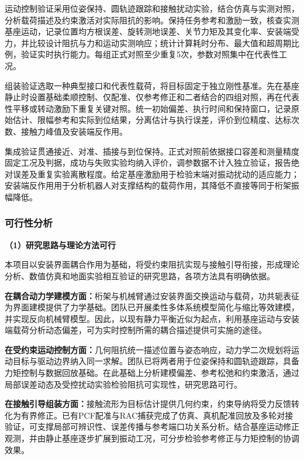 \documentclass[UTF8,a4paper,zihao=-4,fontset=fandol]{ctexart}
\newcommand{\topic}[1]{\par\Needspace{4\baselineskip}\addvspace{0.5em}\noindent\textbf{#1}\par\nobreak}
\newcommand{\rev}[1]{{\color{red}#1}}
\begin{document}
\rev{运动控制验证采用}位姿保持\rev{、}圆轨迹跟踪\rev{和接触扰动实验}，\rev{结合}仿真与实测\rev{对照}，\rev{分析载荷描述}及约束激活\rev{对实际阻抗}的\rev{影响}。\rev{保持任务参考和激励一致，核查实测基座运动，}记录位置均方根误差、旋转测地误差、关节力矩\rev{及其}变化率\rev{、}安装端\rev{受力，并比较设计阻抗与}力和\rev{运动实测响应}；\rev{统计}计算耗时分布、最大值\rev{和超}周期比例，验证实时执行能力。\rev{每组正式对照}至少\rev{重复}5次\rev{，}参数对照\rev{集中}在代表性工况。

\rev{组装验证选取}一种典型接口和代表性载荷，将目标固定于独立刚性基准。先在基座静止时\rev{设置}基础柔顺控制、仅配准、仅参考修正\rev{和}二者结合的四组对照，再\rev{在代表性}平移或转动激励\rev{下}重复关键对照。统一初始偏差、执行\rev{时间}和保持窗口，记录\rev{原始}估计\rev{、限幅参考和实际到位结果，分离估计与执行}误差\rev{，评价}到位\rev{精度}、达标次数、接触力峰值及安装端\rev{反作用}。

\rev{集成验证贯通接近、对准、插接}与\rev{到位保持。正式对照前依据}接口容差\rev{和}测量精度\rev{固定工况及判据}，成功与失败\rev{实验}均纳入评价，调参数据不计入独立验证，报告绝对误差\rev{及}重复\rev{实验}离散程度\rev{。给定基座激励用于检验末端对振动扰动的适应能力}；安装端\rev{反作用}用于分析\rev{机器人}对\rev{支撑结构}的\rev{载荷}作用，其\rev{降低}不直接等同于\rev{桁架振幅降低}。

\subsubsection{可行性分析}

\topic{（1）\rev{研究思路与理论}方法\rev{可行}}

\rev{本项目以安装界面耦合作用为基础，将受约束阻抗实现与接触引导衔接，形成理论分析、数值仿真和地面实验相互验证的研究思路，各项方法具有明确依据。}

\textbf{\rev{在耦合动力学建模方面：}}\rev{桁架与机械臂通过安装界面交换运动与载荷，功共轭表征为界面建模提供了力学基础。团队已开展柔性多体系统模型简化与缩比等效建模，并实现反向机械臂模型。因此，以}现有\rev{静力平衡近似为起点，利用基座运动与安装端载荷分析动态偏差，可为实时控制所需的耦合描述提供可实施的途径。}

\textbf{\rev{在受约束运动控制方面：}}\rev{几何阻抗统一描述位置与姿态响应，动力学二次规划将运动目标与驱动边界纳入同一求解。团队已将两者用于}位姿保持\rev{和}圆轨迹跟踪，\rev{具备力矩控制}与\rev{数据回放基础}。在此基础上\rev{分析}建模偏差\rev{、参考松弛和约束激活，通过局部误差动态}及\rev{受控扰动实验检验阻抗可实现性}，\rev{研究思路可行}。

\textbf{\rev{在}接触\rev{引导组装方面：}}\rev{接触流形为目标估计提供几何约束，约束导纳将受力反馈转化为有界修正。}已有PCF配准与RAC捕获完成了仿真、真机配准回放及多轮对接验证，可\rev{支撑局部可辨识性、误差传播}与参考\rev{端口功关系分析。结合基座运动}修正\rev{观测}，并由\rev{静止}基座逐步扩展\rev{到振动工况，可分步检验参考修正与力矩控制}的\rev{协调效果}。
\end{document}
